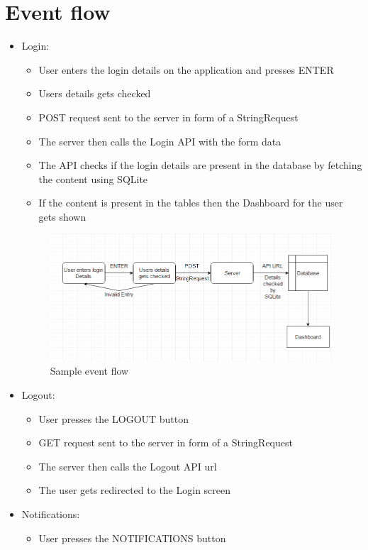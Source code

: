 \documentclass[12pt]{article}
\begin{document}
\section{Event flow}
\begin{itemize}
\item Login:
\begin{itemize}
	\color {blue}
	\item User enters the login details on the application and presses ENTER
	\item Users details gets checked 
	\item POST request sent to the server in form of a StringRequest
	\item The server then calls the Login API with the form data
	\item The API checks if the login details are present in the database by fetching the content using SQLite
	\item If the content is present in the tables then the Dashboard for the user gets shown
\end{itemize}
\begin{figure}[ht!]
\includegraphics[width=150mm]{eventflow.png}
\caption{Sample event flow \label{overflow}}
\end{figure}
\item Logout:
\begin{itemize}
	\color {blue}
	\item User presses the LOGOUT button
	\item GET request sent to the server in form of a StringRequest
	\item The server then calls the Logout API url
	\item The user gets redirected to the Login screen
\end{itemize}
\item Notifications:
\begin{itemize}
	\color {blue}
	\item User presses the NOTIFICATIONS button

\end{itemize}
\end{itemize}
\end{document}
